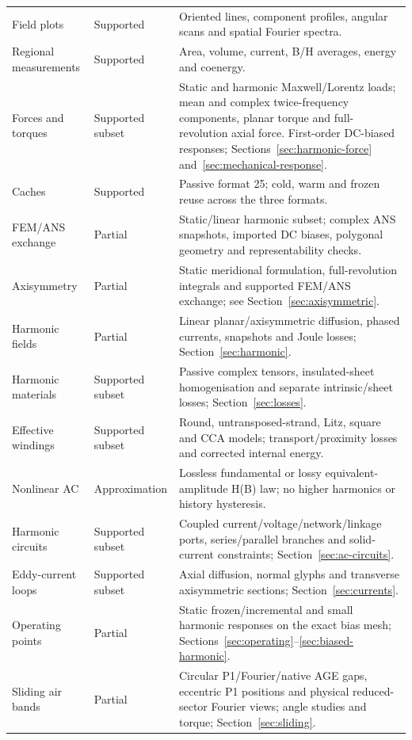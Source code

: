 \begin{longtable}{p{.24\linewidth}p{.13\linewidth}p{.53\linewidth}}
Field plots & Supported & Oriented lines, component profiles, angular scans and spatial Fourier spectra.\\
Regional measurements & Supported & Area, volume, current, B/H averages, energy and coenergy.\\
Forces and torques & Supported subset & Static and harmonic Maxwell/Lorentz loads; mean and complex twice-frequency components, planar torque and full-revolution axial force. First-order DC-biased responses; Sections~\ref{sec:harmonic-force} and~\ref{sec:mechanical-response}.\\
Caches & Supported & Passive format 25; cold, warm and frozen reuse across the three formats.\\
FEM/ANS exchange & Partial & Static/linear harmonic subset; complex ANS snapshots, imported DC biases, polygonal geometry and representability checks.\\
Axisymmetry & Partial & Static meridional formulation, full-revolution integrals and supported FEM/ANS exchange; see Section~\ref{sec:axisymmetric}.\\
Harmonic fields & Partial & Linear planar/axisymmetric diffusion, phased currents, snapshots and Joule losses; Section~\ref{sec:harmonic}.\\
Harmonic materials & Supported subset & Passive complex tensors, insulated-sheet homogenisation and separate intrinsic/sheet losses; Section~\ref{sec:losses}.\\
Effective windings & Supported subset & Round, untransposed-strand, Litz, square and CCA models; transport/proximity losses and corrected internal energy.\\
Nonlinear AC & Approximation & Lossless fundamental or lossy equivalent-amplitude H(B) law; no higher harmonics or history hysteresis.\\
Harmonic circuits & Supported subset & Coupled current/voltage/network/linkage ports, series/parallel branches and solid-current constraints; Section~\ref{sec:ac-circuits}.\\
Eddy-current loops & Supported subset & Axial diffusion, normal glyphs and transverse axisymmetric sections; Section~\ref{sec:currents}.\\
Operating points & Partial & Static frozen/incremental and small harmonic responses on the exact bias mesh; Sections~\ref{sec:operating}--\ref{sec:biased-harmonic}.\\
Sliding air bands & Partial & Circular P1/Fourier/native AGE gaps, eccentric P1 positions and physical reduced-sector Fourier views; angle studies and torque; Section~\ref{sec:sliding}.\\

\end{longtable}
